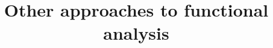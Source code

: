 \documentclass[a4paper, 11pt]{memoir}
\numberwithin{equation}{section}
\theoremstyle{plain}
\theoremstyle{remark}
\theoremstyle{definition}
\begin{document}
\title{Other approaches to functional analysis}
\author{}
\date{}



\frontmatter

\tableofcontents


\mainmatter





\backmatter


\end{document}

